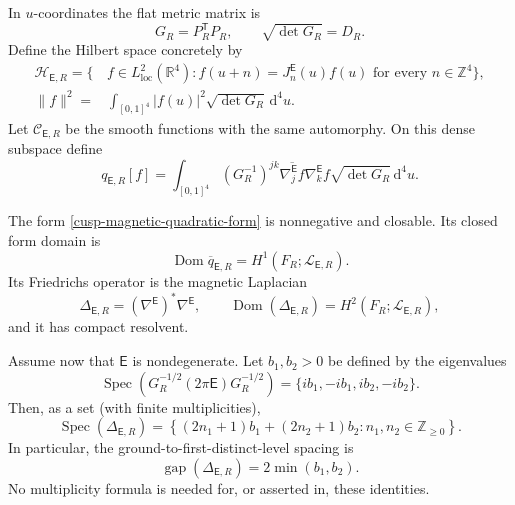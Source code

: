In \(u\)-coordinates the flat metric matrix is
\begin{equation}
 G_R=P_R^{\mathsf T}P_R,
 \qquad
 \sqrt{\det G_R}=D_R.
 \label{cusp-magnetic-flat-Gram}
\end{equation}
Define the Hilbert space concretely by
\begin{align}
 \mathcal H_{\mathsf E,R}
 =\{\,&f\in L^2_{\mathrm{loc}}(\mathbb R^4):
 f(u+n)=J_n^{\mathsf E}(u)f(u)\text{ for every }n\in\mathbb Z^4\},
 \label{cusp-magnetic-Hilbert-space}\\
 \lVert f\rVert^2
 ={}&\int_{[0,1]^4}\lvert f(u)\rvert^2\sqrt{\det G_R}\,\mathrm d^4u.
 \nonumber
\end{align}
Let \(\mathcal C_{\mathsf E,R}\) be the smooth functions with the same
automorphy.  On this dense subspace define
\begin{equation}
 q_{\mathsf E,R}[f]
 =\int_{[0,1]^4}
  (G_R^{-1})^{jk}
  \overline{\nabla^{\mathsf E}_jf}
  \nabla^{\mathsf E}_kf
  \sqrt{\det G_R}\,\mathrm d^4u.
 \label{cusp-magnetic-quadratic-form}
\end{equation}

\begin{theorem}
\label{cusp-magnetic-oscillator-theorem}
The form \eqref{cusp-magnetic-quadratic-form} is nonnegative and closable.
Its closed form domain is
\[
 \operatorname{Dom}\overline q_{\mathsf E,R}
 =H^1(F_R;\mathscr L_{\mathsf E,R}).
\]
Its Friedrichs operator is the
magnetic Laplacian
\[
 \Delta_{\mathsf E,R}=(\nabla^{\mathsf E})^*\nabla^{\mathsf E},
 \qquad
 \operatorname{Dom}(\Delta_{\mathsf E,R})
 =H^2(F_R;\mathscr L_{\mathsf E,R}),
\]
and it has compact resolvent.

Assume now that \(\mathsf E\) is nondegenerate.  Let \(b_1,b_2>0\) be
defined by the eigenvalues
\begin{equation}
 \operatorname{Spec}\!\left(
  G_R^{-1/2}(2\pi\mathsf E)G_R^{-1/2}\right)
 =\{ib_1,-ib_1,ib_2,-ib_2\}.
 \label{cusp-magnetic-frequency-definition}
\end{equation}
Then, as a set (with finite multiplicities),
\begin{equation}
 \operatorname{Spec}(\Delta_{\mathsf E,R})
 =\left\{(2n_1+1)b_1+(2n_2+1)b_2:
 n_1,n_2\in\mathbb Z_{\ge0}\right\}.
 \label{cusp-magnetic-oscillator-spectrum}
\end{equation}
In particular, the ground-to-first-distinct-level spacing is
\begin{equation}
 \operatorname{gap}(\Delta_{\mathsf E,R})=2\min(b_1,b_2).
 \label{cusp-magnetic-level-gap}
\end{equation}
No multiplicity formula is needed for, or asserted in, these identities.
\end{theorem}

